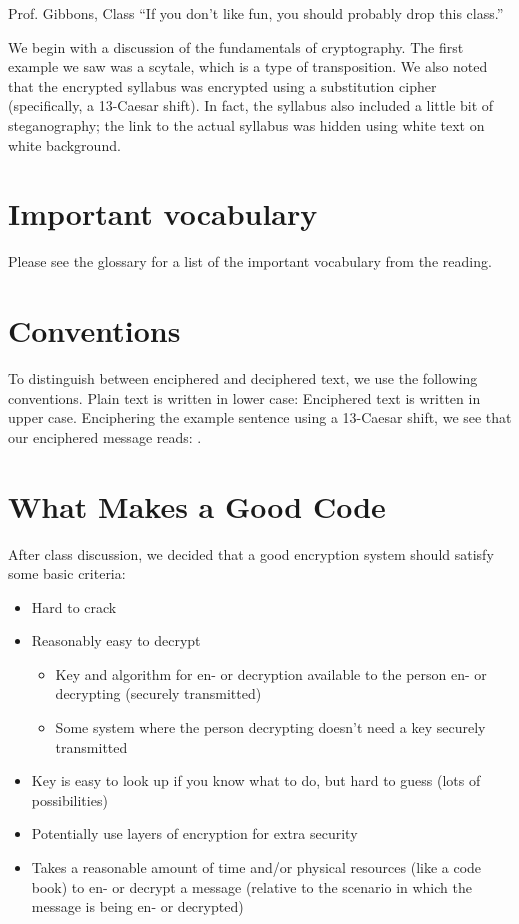 \begin{chapquote}{Prof. Gibbons, Class}
``If you don't like fun, you should probably drop this class.''
\end{chapquote}

We begin with a discussion of the fundamentals of \gls{cryptography}.  The first example we saw was a \gls{scytale}, which is a type of \gls{transposition}.  We also noted that the encrypted syllabus was encrypted using a \gls{substitution} cipher (specifically, a 13-\gls{Caesar shift}).  In fact, the syllabus also included a little bit of \gls{steganography}; the link to the actual syllabus was hidden using white text on white background.

\section{Important vocabulary}
 
Please see the glossary for a list of the important vocabulary from the reading.

\section{Conventions}
To distinguish between enciphered and deciphered text, we use the following conventions.  Plain text is written in lower case:   
Enciphered text is written in upper case.  Enciphering the example sentence using a 13-Caesar shift, we see that our enciphered message reads:
{\tt \ex}.


\section{What Makes a Good Code}
After class discussion, we decided that a good encryption system should satisfy some basic criteria:
\begin{itemize}
\item Hard to crack
\item Reasonably easy to decrypt
    \begin{itemize}
    \item Key and algorithm for en- or decryption available to the person en- or decrypting (securely transmitted)
    \item Some system where the person decrypting doesn't need a key securely transmitted
    \end{itemize}
\item Key is easy to look up if you know what to do, but hard to guess (lots of possibilities)
\item Potentially use layers of encryption for extra security
\item Takes a reasonable amount of time and/or physical resources (like a code book) to en- or decrypt a message (relative to the scenario in which the message is being en- or decrypted)
\end{itemize}


